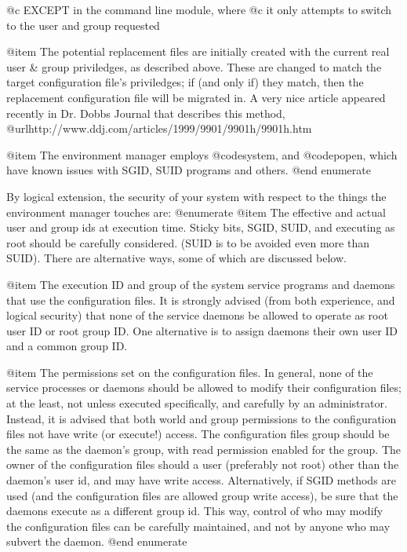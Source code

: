 {{@c EXCEPT in the command line module, where
@c it only attempts to switch to the user and group requested

@item The potential replacement files are initially created with the current
real user & group priviledges, as described above.  These are changed to match
the target configuration file's priviledges; if (and only if) they match, then
the replacement configuration file will be migrated in.  A very nice article
appeared recently in Dr. Dobbs Journal that describes this method,
@url{http://www.ddj.com/articles/1999/9901/9901h/9901h.htm}

@item The environment manager employs @code{system}, and @code{popen}, which
have known issues with SGID, SUID programs and others.
@end enumerate

By logical extension, the security of your system with respect to the things
the environment manager touches are:
@enumerate
@item The effective and actual user and group ids at execution time.  Sticky
bits, SGID, SUID, and executing as root should be carefully considered.  (SUID
is to be avoided even more than SUID). There are alternative ways, some of
which are discussed below.

@item The execution ID and group of the system service programs and daemons
that use the configuration files.  It is strongly advised (from both
experience, and logical security) that none of the service daemons be allowed
to operate as root user ID or root group ID.  One alternative is to assign
daemons their own user ID and a common group ID.

@item The permissions set on the configuration files.  In general, none of the
service processes or daemons should be allowed to modify their configuration
files; at the least, not unless executed specifically, and carefully by an
administrator.  Instead, it is advised that both world and group permissions
to the configuration files not have write (or execute!) access.  The
configuration files group should be the same as the daemon's group, with read
permission enabled for the group.  The owner of the configuration files should
a user (preferably not root) other than the daemon's user id, and may have
write access.  Alternatively, if SGID methods are used (and the configuration
files are allowed group write access), be sure that the daemons execute as a
different group id.   This way, control of who may modify the configuration
files can be carefully maintained, and not by anyone who may subvert the
daemon.
@end enumerate

}}

